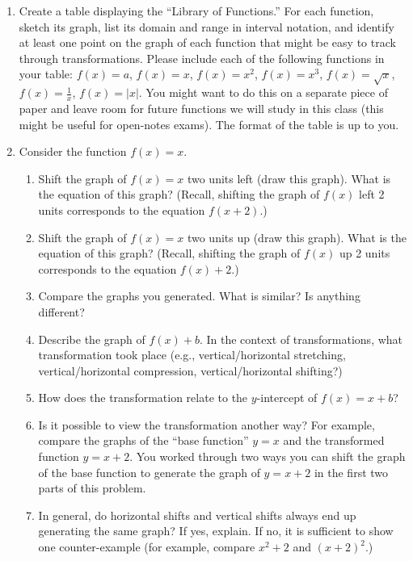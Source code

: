 \documentclass[12pt]{amsart}
\begin{document}
\begin{enumerate}
\item Create a table displaying the ``Library of Functions.''  For each function, sketch its graph, list its domain and range in interval notation, and identify at least one point on the graph of each function that might be easy to track through transformations.  Please include each of the following functions in your table: $f(x)=a$, $f(x)=x$, $f(x)=x^2$, $f(x)=x^3$, $f(x)=\sqrt{x}$, $f(x)=\frac{1}{x}$, $f(x)=|x|$.  You might want to do this on a separate piece of paper and leave room for future functions we will study in this class (this might be useful for open-notes exams).  The format of the table is up to you.  

\item Consider the function $f(x)=x$.
\begin{enumerate}
  \item  Shift the graph of  $f(x)=x$ two units left (draw this graph).  What is the equation of this graph?  (Recall, shifting the graph of $f(x)$ left 2 units corresponds to the equation $f(x+2)$.)
   \item  Shift the graph of  $f(x)=x$ two units up (draw this graph).  What is the equation of this graph?  (Recall, shifting the graph of $f(x)$ up 2 units corresponds to the equation $f(x)+2$.)
   \item Compare the graphs you generated.  What is similar?  Is anything different?
     \item Describe the graph of $f(x)+b$.  In the context of transformations, what transformation took place (e.g., vertical/horizontal stretching, vertical/horizontal compression, vertical/horizontal shifting?)
     \item How does the transformation relate to the $y$-intercept of $f(x)=x+b$?
     \item Is it possible to view the transformation another way?  For example, compare the graphs of the ``base function'' $y=x$ and the transformed function $y=x+2$.  You worked through two ways you can shift the graph of the base function to generate the graph of $y=x+2$ in the first two parts of this problem.
     \item In general, do horizontal shifts and vertical shifts always end up generating the same graph?  If yes, explain.  If no, it is sufficient to show one counter-example (for example, compare $x^2+2$ and $(x+2)^2$.)
     \end{enumerate}



\end{enumerate}
\end{document}
